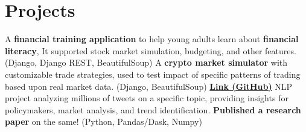 \section{Projects}
  \resumeSubHeadingListStart
      {A \textbf{financial training application} to help young adults learn about \textbf{financial literacy}, It supported stock market simulation, budgeting, and other features. (Django, Django REST, BeautifulSoup)}
      {A \textbf{crypto market simulator} with customizable trade strategies, used to test impact of specific patterns of trading based upon real market data. (Django, BeautifulSoup) \href{https://github.com/hari01584/WazirX-Trade-assist-bot-and-Simulator-}{\textbf{Link (GitHub)}}}
      {NLP project analyzing millions of tweets on a specific topic, providing insights for policymakers, market analysis, and trend identification. \textbf{Published a research paper} on the same! (Python, Pandas/Dask, Numpy)}
  \resumeSubHeadingListEnd